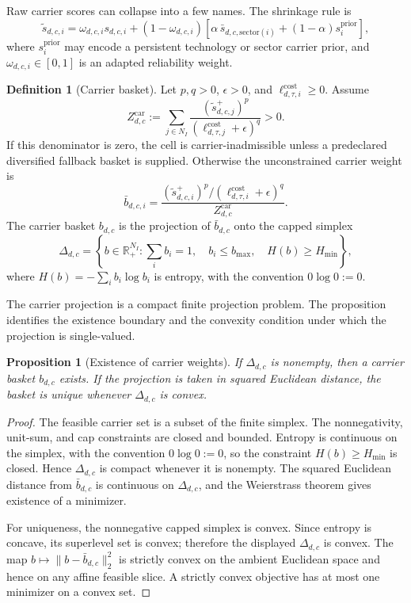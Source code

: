 \documentclass[11pt,a4paper]{amsart}
\theoremstyle{plain}
\newtheorem{proposition}[theorem]{Proposition}
\theoremstyle{definition}
\newtheorem{definition}[theorem]{Definition}
\theoremstyle{remark}
\newcommand{\R}{\mathbb{R}}
\begin{document}
Raw carrier scores can collapse into a few names.  The shrinkage rule is
\[
        \widetilde s_{d,c,i}
        =
        \omega_{d,c,i}s_{d,c,i}
        +(1-\omega_{d,c,i})
        \left[
        \alpha\,\bar s_{d,c,\mathrm{sector}(i)}
        +(1-\alpha)s_i^{\mathrm{prior}}
        \right],
\]
where \(s_i^{\mathrm{prior}}\) may encode a persistent technology or sector carrier prior, and
\(\omega_{d,c,i}\in[0,1]\) is an adapted reliability weight.

\begin{definition}[Carrier basket]\label{def:carrier-basket}
Let \(p,q>0\), \(\epsilon>0\), and \(\ell_{d,\tau,i}^{\mathrm{cost}}\ge0\).  Assume
\[
        Z_{d,c}^{\mathrm{car}}
        :=
        \sum_{j\in N_I}
        \frac{(\widetilde s_{d,c,j}^{+})^p}
        {(\ell_{d,\tau,j}^{\mathrm{cost}}+\epsilon)^q}
        >0.
\]
If this denominator is zero, the cell is carrier-inadmissible unless a predeclared diversified
fallback basket is supplied.  Otherwise the unconstrained carrier weight is
\[
        \bar b_{d,c,i}
        =
        \frac{(\widetilde s_{d,c,i}^{+})^p/
        (\ell_{d,\tau,i}^{\mathrm{cost}}+\epsilon)^q}
        {Z_{d,c}^{\mathrm{car}}}.
\]
The carrier basket \(b_{d,c}\) is the projection of \(\bar b_{d,c}\) onto the capped simplex
\[
        \Delta_{d,c}
        =
        \left\{
        b\in\R_+^{N_I}:
        \sum_i b_i=1,\quad
        b_i\le b_{\max},\quad
        H(b)\ge H_{\min}
        \right\},
\]
where \(H(b)=-\sum_i b_i\log b_i\) is entropy, with the convention \(0\log0:=0\).
\end{definition}

The carrier projection is a compact finite projection problem.  The proposition identifies the
existence boundary and the convexity condition under which the projection is single-valued.

\begin{proposition}[Existence of carrier weights]\label{prop:carrier-existence}
If \(\Delta_{d,c}\) is nonempty, then a carrier basket \(b_{d,c}\) exists.  If the projection is
taken in squared Euclidean distance, the basket is unique whenever \(\Delta_{d,c}\) is convex.
\end{proposition}

\begin{proof}
The feasible carrier set is a subset of the finite simplex.  The nonnegativity, unit-sum, and cap
constraints are closed and bounded.  Entropy is continuous on the simplex, with the convention
\(0\log0:=0\), so the constraint \(H(b)\ge H_{\min}\) is closed.  Hence \(\Delta_{d,c}\) is compact
whenever it is nonempty.  The squared Euclidean distance from \(\bar b_{d,c}\) is continuous on
\(\Delta_{d,c}\), and the Weierstrass theorem gives existence of a minimizer.

For uniqueness, the nonnegative capped simplex is convex.  Since entropy is concave, its
superlevel set is convex; therefore the displayed \(\Delta_{d,c}\) is convex.  The map
\(b\mapsto \|b-\bar b_{d,c}\|_2^2\) is strictly convex on the ambient Euclidean space and hence on
any affine feasible slice.  A strictly convex objective has at most one minimizer on a convex set.
\end{proof}
\end{document}
